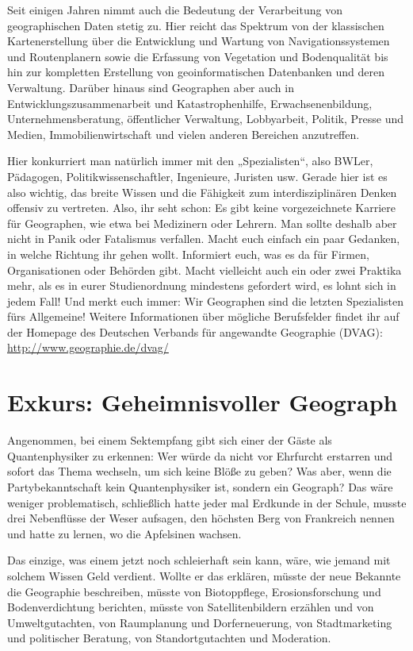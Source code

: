 Seit einigen Jahren nimmt auch die Bedeutung der Verarbeitung von geographischen Daten stetig zu. Hier reicht das Spektrum von der klassischen Kartenerstellung über die Entwicklung und Wartung von Navigationssystemen und Routenplanern sowie die Erfassung von Vegetation und Bodenqualität bis hin zur kompletten Erstellung von geoinformatischen Datenbanken und deren Verwaltung. Darüber hinaus sind Geographen aber auch in Entwicklungszusammenarbeit und Katastrophenhilfe, Erwachsenenbildung, Unternehmensberatung, öffentlicher Verwaltung, Lobbyarbeit, Politik, Presse und Medien, Immobilienwirtschaft und vielen anderen Bereichen anzutreffen.

Hier konkurriert man natürlich immer mit den „Spezialisten“, also BWLer, Pädagogen, Politikwissenschaftler, Ingenieure, Juristen usw. Gerade hier ist es also wichtig, das breite Wissen und die Fähigkeit zum interdisziplinären Denken offensiv zu vertreten. Also, ihr seht schon: Es gibt keine vorgezeichnete Karriere für Geographen, wie etwa bei Medizinern oder Lehrern. Man sollte deshalb aber nicht in Panik oder Fatalismus verfallen. Macht euch einfach ein paar Gedanken, in welche Richtung ihr gehen wollt. Informiert euch, was es da für Firmen, Organisationen oder Behörden gibt. Macht vielleicht auch ein oder zwei Praktika mehr, als es in eurer Studienordnung mindestens gefordert wird, es lohnt sich in jedem Fall! Und merkt euch immer: Wir Geographen sind die letzten Spezialisten fürs Allgemeine! Weitere Informationen über mögliche Berufsfelder ﬁndet ihr auf der Homepage des Deutschen Verbands für angewandte Geographie (DVAG): \url{http://www.geographie.de/dvag/}

\section*{Exkurs: Geheimnisvoller Geograph}
Angenommen, bei einem Sektempfang gibt sich einer der Gäste als Quantenphysiker zu erkennen: Wer würde da nicht vor Ehrfurcht erstarren und sofort das Thema wechseln, um sich keine Blöße zu geben? Was aber, wenn die Partybekanntschaft kein Quantenphysiker ist, sondern ein Geograph? Das wäre weniger problematisch, schließlich hatte jeder mal Erdkunde in der Schule, musste drei Nebenﬂüsse der Weser aufsagen, den höchsten Berg von Frankreich nennen und hatte zu lernen, wo die Apfelsinen wachsen.

Das einzige, was einem jetzt noch schleierhaft sein kann, wäre, wie jemand mit solchem Wissen Geld verdient. Wollte er das erklären, müsste der neue Bekannte die Geographie beschreiben, müsste von Biotoppﬂege, Erosionsforschung und Bodenverdichtung berichten, müsste von Satellitenbildern erzählen und von Umweltgutachten, von Raumplanung und Dorferneuerung, von Stadtmarketing und politischer Beratung, von Standortgutachten und Moderation.

